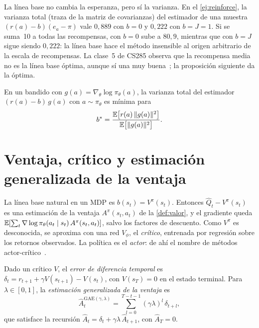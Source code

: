 La línea base no cambia la esperanza, pero sí la varianza. En el \cref{ej:reinforce}, la varianza total (traza de la matriz de covarianzas) del estimador de una muestra $(r(a)-b)(e_a-\pi)$ vale $0{,}889$ con $b=0$ y $0{,}222$ con $b=J=1$. Si se suma~10 a todas las recompensas, con $b=0$ sube a $80{,}9$, mientras que con $b=J$ sigue siendo $0{,}222$: la línea base hace el método insensible al origen arbitrario de la escala de recompensas. La clase~5 de CS285 observa que la recompensa media no es la línea base óptima, aunque sí una muy buena~\cite{cs285}; la proposición siguiente da la óptima.

\begin{proposicion}\label{prop:baseline-optima}
En un bandido con $g(a)=\nabla_\theta\log\pi_\theta(a)$, la varianza total del estimador $(r(a)-b)\,g(a)$ con $a\sim\pi_\theta$ es mínima para
\[
b^{*}=\frac{\mathbb{E}\bigl[r(a)\,\lVert g(a)\rVert^{2}\bigr]}{\mathbb{E}\bigl[\lVert g(a)\rVert^{2}\bigr]}.
\]
\end{proposicion}

\addtocounter{definicion}{1}%

\section{Ventaja, crítico y estimación generalizada de la ventaja}

La línea base natural en un MDP es $b(s_t)=V^{\pi}(s_t)$. Entonces $\widehat Q_t-V^{\pi}(s_t)$ es una estimación de la ventaja $A^{\pi}(s_t,a_t)$ de la \cref{def:valor}, y el gradiente queda $\mathbb{E}[\sum_t\nabla\log\pi_\theta(a_t\mid s_t)\,A^{\pi}(s_t,a_t)]$, salvo los factores de descuento. Como $V^{\pi}$ es desconocida, se aproxima con una red $V_\phi$, el \emph{crítico}, entrenada por regresión sobre los retornos observados. La política es el \emph{actor}: de ahí el nombre de métodos actor-crítico~\cite[§13.5]{sb}.

\begin{definicion}\label{def:gae}
Dado un crítico $V$, el \emph{error de diferencia temporal} es $\delta_t=r_{t+1}+\gamma V(s_{t+1})-V(s_t)$, con $V(s_T)=0$ en el estado terminal. Para $\lambda\in[0,1]$, la \emph{estimación generalizada de la ventaja} es~\cite{gae}
\[
\widehat A^{\mathrm{GAE}(\gamma,\lambda)}_t=\sum_{l=0}^{T-t-1}(\gamma\lambda)^{l}\,\delta_{t+l},
\]
que satisface la recursión $\widehat A_t=\delta_t+\gamma\lambda\,\widehat A_{t+1}$, con $\widehat A_T=0$.
\end{definicion}

